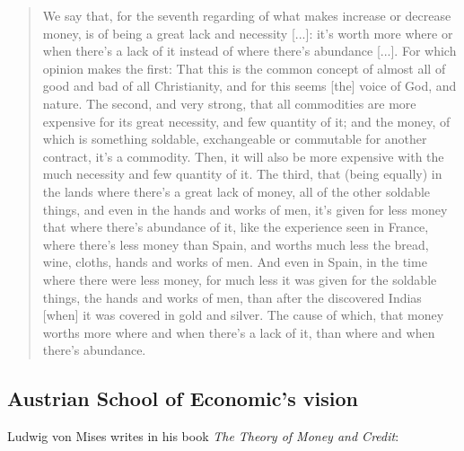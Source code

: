 \documentclass[12pt,a4paper,twoside]{book}
\begin{document}
\begin{quotation}
We say that, for the seventh regarding of what makes increase or decrease money, is of being a great lack and necessity [...]: it's worth more where or when there's a lack of it instead of where there's abundance [...]. For which opinion makes the first: That this is the common concept of almost all of good and bad of all Christianity, and for this seems [the] voice of God, and nature. The second, and very strong, that all commodities are more expensive for its great necessity, and few quantity of it; and the money, of which is something soldable, exchangeable or commutable for another contract, it's a commodity. Then, it will also be more expensive with the much necessity and few quantity of it. The third, that (being equally) in the lands where there's a great lack of money, all of the other soldable things, and even in the hands and works of men, it's given for less money that where there's abundance of it, like the experience seen in France, where there's less money than Spain, and worths much less the bread, wine, cloths, hands and works of men. And even in Spain, in the time where there were less money, for much less it was given for the soldable things, the hands and works of men, than after the discovered Indias [when] it was covered in gold and silver. The cause of which, that money worths more where and when there's a lack of it, than where and when there's abundance. \cite[pp. 54-55]{azpilcueta}
\end{quotation}

\subsection{Austrian School of Economic's vision}
Ludwig von Mises writes in his book \textit{The Theory of Money and Credit}:
\end{document}
